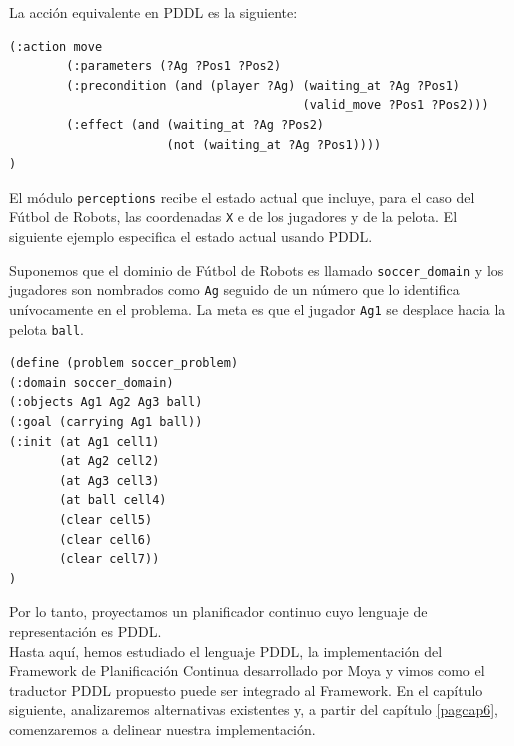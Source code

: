 \begin{ejemplo}

La acci\'on equivalente en PDDL es la siguiente:

 \begin{verbatim}
(:action move
        (:parameters (?Ag ?Pos1 ?Pos2)
        (:precondition (and (player ?Ag) (waiting_at ?Ag ?Pos1)
                                         (valid_move ?Pos1 ?Pos2)))
        (:effect (and (waiting_at ?Ag ?Pos2) 
                      (not (waiting_at ?Ag ?Pos1))))
)        
 \end{verbatim}
\end{ejemplo}

El m\'odulo \texttt{perceptions} recibe el estado actual que incluye,
para el caso del F\'utbol de Robots, las coordenadas \texttt{X} e  de los jugadores
y de la pelota. El siguiente ejemplo especifica el estado actual
usando PDDL.

\begin{ejemplo}%

Suponemos que el dominio de F\'utbol de Robots es llamado
\texttt{soccer\_domain} y los jugadores son nombrados
como \texttt{Ag} seguido de un n\'umero que lo identifica
un\'ivocamente en el problema. La meta es que el jugador
\texttt{Ag1} se desplace hacia la pelota \texttt{ball}.

 \begin{verbatim}
(define (problem soccer_problem)
(:domain soccer_domain)
(:objects Ag1 Ag2 Ag3 ball)
(:goal (carrying Ag1 ball))
(:init (at Ag1 cell1)
       (at Ag2 cell2)
       (at Ag3 cell3)
       (at ball cell4)
       (clear cell5)
       (clear cell6)
       (clear cell7))
)
 \end{verbatim}
\end{ejemplo}

Por lo tanto, proyectamos un planificador continuo cuyo lenguaje
de representaci\'on es PDDL.
\ \\

Hasta aqu\'i, hemos estudiado el lenguaje PDDL, la
implementaci\'on del Framework de Planificaci\'on Continua
desarrollado por Moya y vimos como el traductor PDDL propuesto
puede ser integrado al Framework.
En el cap\'itulo siguiente, analizaremos alternativas existentes y, a
partir del cap\'itulo \ref{pagcap6}, comenzaremos a delinear
nuestra implementaci\'on.


